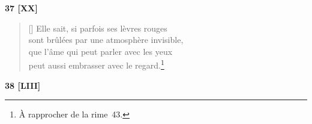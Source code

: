 \documentclass[a4paper,12pt]{book}
\begin{document}
\bigskip

\begin{center}
  \textbf{37 [XX]}
\end{center}

\settowidth{\versewidth}{sont brûlées par une atmosphère invisible,}

\begin{verse}[\versewidth]
  Elle sait, si parfois ses lèvres rouges \\
  sont brûlées par une atmosphère invisible, \\
  que l'âme qui peut parler avec les yeux \\
  peut aussi embrasser avec le regard.\footnote{À rapprocher de la rime~43.}
\end{verse}

\bigskip

\begin{center}
  \textbf{38 [LIII]}
\end{center}

\settowidth{\versewidth}{et, à nouveau, leurs fleurs s'ouvriront le soir,}
\end{document}
